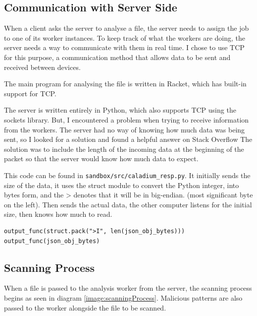\subsection{Communication with Server Side}
When a client asks the server to analyse a file,
the server needs to assign the job to one of its worker instances.
To keep track of what the workers are doing,
the server needs a way to communicate with them in real time.
I chose to use TCP for this purpose,
a communication method that allows data to be sent and received between devices.

The main program for analysing the file is written in Racket,
which has built-in support for TCP.

The server is written entirely in Python,
which also supports TCP using the sockets library.
But, I encountered a problem when trying to receive information from the workers.
The server had no way of knowing how much data was being sent,
so I looked for a solution and found a
helpful answer on Stack Overflow \cite{chqrlie:2022}
The solution was to include the length of the incoming
data at the beginning of the packet
so that the server would know how much data to expect.

This code can be found in \texttt{sandbox/src/caladium\_resp.py}.
It initially sends the size of the data,
it uses the struct module to convert the Python integer,
into bytes form, and the > denotes that it will be in big-endian.
(most significant byte on the left).
Then sends the actual data,
the other computer listens for the initial size,
then knows how much to read.

\begin{lstlisting}
output_func(struct.pack(">I", len(json_obj_bytes)))
output_func(json_obj_bytes)
\end{lstlisting}

\subsection{Scanning Process}
When a file is passed to the analysis worker from the server,
the scanning process begins as seen in diagram \ref{image:scanningProcess}.
Malicious patterns are also passed to the worker
alongside the file to be scanned.

